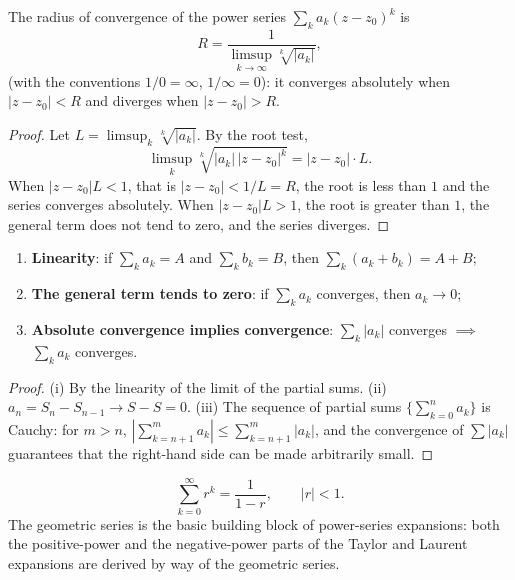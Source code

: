 \begin{theorem}\label{thm:cauchy_hadamard}
The radius of convergence of the power series $\sum_k a_k (z - z_0)^k$ is
\[
R = \frac{1}{\limsup_{k\to\infty} \sqrt[k]{|a_k|}},
\]
(with the conventions $1/0 = \infty$, $1/\infty = 0$): it converges absolutely when $|z - z_0| < R$ and diverges when $|z - z_0| > R$.
\end{theorem}

\begin{proof}
Let $L = \limsup_k \sqrt[k]{|a_k|}$. By the root test,
\[
\limsup_{k} \sqrt[k]{|a_k|\,|z-z_0|^k} = |z-z_0| \cdot L.
\]
When $|z-z_0| L < 1$, that is $|z-z_0| < 1/L = R$, the root is less than $1$ and the series converges absolutely. When $|z-z_0| L > 1$, the root is greater than $1$, the general term does not tend to zero, and the series diverges.
\end{proof}

\begin{property}\label{prop:series_properties}
\begin{enumerate}[label=(\roman*)]
    \item \textbf{Linearity}: if $\sum_k a_k = A$ and $\sum_k b_k = B$, then $\sum_k (a_k + b_k) = A + B$;
    \item \textbf{The general term tends to zero}: if $\sum_k a_k$ converges, then $a_k \to 0$;
    \item \textbf{Absolute convergence implies convergence}: $\sum_k |a_k|$ converges $\implies$ $\sum_k a_k$ converges.
\end{enumerate}
\end{property}

\begin{proof}
(i) By the linearity of the limit of the partial sums. (ii) $a_n = S_n - S_{n-1} \to S - S = 0$. (iii) The sequence of partial sums $\{\sum_{k=0}^{n} a_k\}$ is Cauchy: for $m > n$, $|\sum_{k=n+1}^m a_k| \le \sum_{k=n+1}^m |a_k|$, and the convergence of $\sum |a_k|$ guarantees that the right-hand side can be made arbitrarily small.
\end{proof}

\begin{example}\label{ex:geometric_series}
\[
\sum_{k=0}^{\infty} r^k = \frac{1}{1-r}, \qquad |r| < 1.
\]
The geometric series is the basic building block of power-series expansions: both the positive-power and the negative-power parts of the Taylor and Laurent expansions are derived by way of the geometric series.
\end{example}

